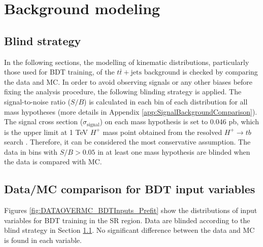 \section{Background modeling}
\label{sec:BkgModeling}

\subsection{Blind strategy}
\label{subsec:BlindStrategy}
In the following sections, the modelling of kinematic distributions, particularly those used for BDT training, of the $t\bar{t}+\text{jets}$ background is checked by comparing the data and MC. In order to avoid observing signals or any other biases before fixing the analysis procedure, the following blinding strategy is applied. The signal-to-noise ratio ($S/B$) is calculated in each bin of each distribution for all mass hypotheses (more details in Appendix \ref{app:SignalBackgroundComparison}). The signal cross section (${\sigma}_{\text{signal}}$) on each mass hypothesis is set to 0.046 pb, which is the upper limit at 1 TeV $H^{+}$ mass point obtained from the resolved $H^{+}{\rightarrow}tb$ search \cite{HDBS-2021-02}. Therefore, it can be considered the most conservative assumption. The data in bins with $S/B>0.05$ in at least one mass hypothesis are blinded when the data is compared with MC.

\subsection{Data/MC comparison for BDT input variables}
\label{subsec:Data/MCBDTInputBeforeReweight}
Figures \ref{fig:DATAOVERMC_BDTInputs_Prefit} show the distributions of input variables for BDT training in the SR region. Data are blinded according to the blind strategy in Section \ref{subsec:BlindStrategy}. No significant difference between the data and MC is found in each variable.

